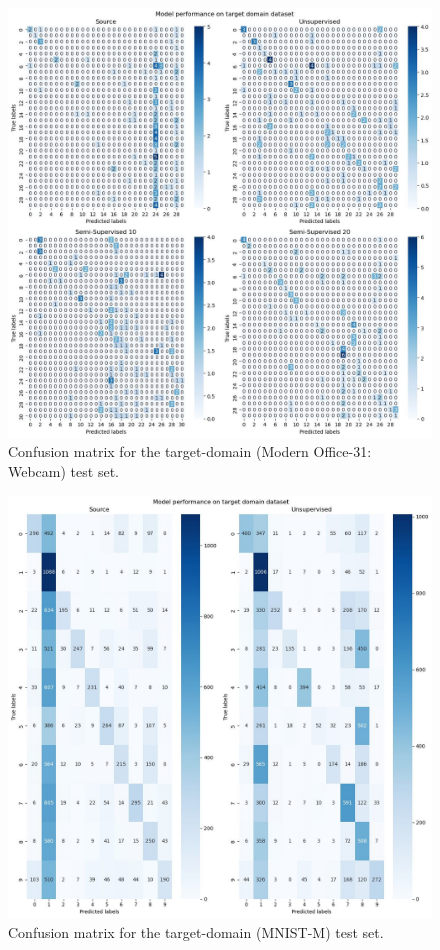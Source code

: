 \documentclass{article}
\begin{document}
	\begin{figure}
		\centering
		\includegraphics[width=12cm]{"office_cls_matrix.jpeg"}
		\caption{Confusion matrix for the target-domain (Modern Office-31: Webcam) test set.}
		\label{fig::office_confusion}
	\end{figure}

	\begin{figure}
		\centering
		\includegraphics[width=12cm]{"mnist_cls_matrix.jpeg"}
		\caption{Confusion matrix for the target-domain (MNIST-M) test set.}
		\label{fig::mnist_confusion}
	\end{figure}
\end{document}
